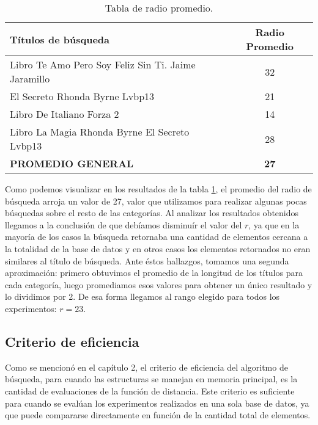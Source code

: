 \begin{table}[H]
\begin{center}
\begin{tabular}{|l|c|}
\hline 
\small T\'itulos de b\'usqueda
&
\small Radio Promedio\\
\hline \hline
\small Libro Te Amo Pero Soy Feliz Sin Ti. Jaime Jaramillo & 32  \\ \hline
\small El Secreto Rhonda Byrne Lvbp13 & 21  \\ \hline
\small Libro De Italiano Forza 2 & 14  \\ \hline
\small Libro La Magia Rhonda Byrne El Secreto Lvbp13 & 28  \\ \hline  \hline
\hspace{4cm}  \textbf{\small PROMEDIO GENERAL} & \textbf{27} \\ \hline
\end{tabular}
\caption{\small Tabla de radio promedio.}
\label{tabla:promedios-rank}
\end{center}
\end{table}

Como podemos visualizar en los resultados de la tabla \ref{tabla:promedios-rank}, el promedio del radio de b\'usqueda arroja un valor de 27, valor que utilizamos para realizar algunas pocas b\'usquedas sobre el resto de las categor\'ias. Al analizar los resultados obtenidos llegamos a la conclusi\'on de que deb\'iamos disminu\'ir el valor del $r$, ya que en la mayor\'ia de los casos la b\'usqueda retornaba una cantidad de elementos cercana a la totalidad de la base de datos y en otros casos los elementos retornados no eran similares al t\'itulo de b\'usqueda. Ante \'estos hallazgos, tomamos una segunda aproximaci\'on: primero obtuvimos el promedio de la longitud de los t\'itulos para cada categor\'ia, luego promediamos esos valores para obtener un \'unico resultado y lo dividimos por 2.  De esa forma llegamos al rango elegido para todos los experimentos: $r=23$.\\

\subsection{Criterio de eficiencia}

Como se mencion\'o en el cap\'itulo 2, el criterio de eficiencia del algoritmo de b\'usqueda, para cuando las estructuras se manejan en memoria principal, es la cantidad de evaluaciones de la funci\'on de distancia. Este criterio es suficiente para cuando se eval\'uan los experimentos realizados en una sola base de datos, ya que puede compararse directamente en funci\'on de la cantidad total de elementos.\\

